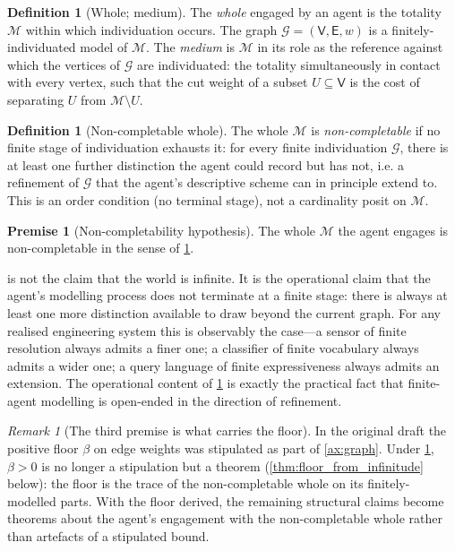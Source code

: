 \documentclass[11pt,twocolumn,a4paper]{article}
\theoremstyle{thmstyle}
\theoremstyle{definition}
\newtheorem{definition}[theorem]{Definition}
\newtheorem{axiom}{Premise}
\theoremstyle{remark}
\newtheorem{remark}[theorem]{Remark}
\newcommand{\Graph}{\mathcal{G}}
\newcommand{\Vrt}{\mathsf{V}}
\newcommand{\Edg}{\mathsf{E}}
\newcommand{\floor}{\beta}
\begin{document}
\begin{definition}[Whole; medium]
\label{def:medium}
The \emph{whole} engaged by an agent is the totality
$\mathcal{M}$ within which individuation occurs. The graph
$\Graph = (\Vrt, \Edg, w)$ is a finitely-individuated model of
$\mathcal{M}$. The \emph{medium} is $\mathcal{M}$ in its role as
the reference against which the vertices of $\Graph$ are
individuated: the totality simultaneously in contact with every
vertex, such that the cut weight of a subset $U \subseteq \Vrt$ is
the cost of separating $U$ from $\mathcal{M}\setminus U$.
\end{definition}

\begin{definition}[Non-completable whole]
\label{def:noncompletable}
The whole $\mathcal{M}$ is \emph{non-completable} if no finite
stage of individuation exhausts it: for every finite individuation
$\Graph$, there is at least one further distinction the agent could
record but has not, i.e. a refinement of $\Graph$ that the agent's
descriptive scheme can in principle extend to. This is an order
condition (no terminal stage), not a cardinality posit on
$\mathcal{M}$.
\end{definition}

\begin{axiom}[Non-completability hypothesis]
\label{ax:noncompletable}
The whole $\mathcal{M}$ the agent engages is non-completable in the
sense of \cref{def:noncompletable}.
\end{axiom}

 is not the claim that the world is
infinite. It is the operational claim that the agent's modelling
process does not terminate at a finite stage: there is always at
least one more distinction available to draw beyond the current
graph. For any realised engineering system this is observably the
case---a sensor of finite resolution always admits a finer one; a
classifier of finite vocabulary always admits a wider one; a query
language of finite expressiveness always admits an extension. The
operational content of \cref{ax:noncompletable} is exactly the
practical fact that finite-agent modelling is open-ended in the
direction of refinement.

\begin{remark}[The third premise is what carries the floor]
\label{rem:third_carries}
In the original draft the positive floor $\floor$ on edge weights
was stipulated as part of \cref{ax:graph}. Under
\cref{ax:noncompletable}, $\floor > 0$ is no longer a stipulation
but a theorem (\cref{thm:floor_from_infinitude} below): the floor
is the trace of the non-completable whole on its finitely-modelled
parts. With the floor derived, the remaining structural claims
become theorems about the agent's engagement with the
non-completable whole rather than artefacts of a stipulated bound.
\end{remark}
\end{document}
